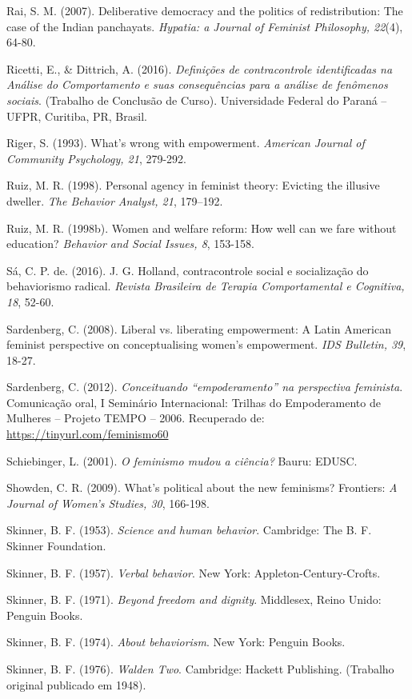 \hangindent=25pt
\noindent Rai, S. M. (2007). Deliberative democracy and the politics of redistribution: The case of the Indian panchayats. \textit{Hypatia: a Journal of Feminist Philosophy, 22}(4), 64-80.

\hangindent=25pt
\noindent Ricetti, E., \& Dittrich, A. (2016). \textit{Definições de contracontrole identificadas na Análise do Comportamento e suas consequências para a análise de fenômenos sociais}. (Trabalho de Conclusão de Curso). Universidade Federal do Paraná – UFPR, Curitiba, PR, Brasil.

\hangindent=25pt
\noindent Riger, S. (1993). What’s wrong with empowerment. \textit{American Journal of Community Psychology, 21}, 279-292.

\hangindent=25pt
\noindent Ruiz, M. R. (1998). Personal agency in feminist theory: Evicting the illusive dweller. \textit{The Behavior Analyst, 21}, 179–192.

\hangindent=25pt
\noindent Ruiz, M. R. (1998b). Women and welfare reform: How well can we fare without education? \textit{Behavior and Social Issues, 8}, 153-158.

\hangindent=25pt
\noindent Sá, C. P. de. (2016). J. G. Holland, contracontrole social e socialização do behaviorismo radical. \textit{Revista Brasileira de Terapia Comportamental e Cognitiva, 18}, 52-60.

\hangindent=25pt
\noindent Sardenberg, C. (2008). Liberal vs. liberating empowerment: A Latin American 	feminist perspective on conceptualising women's empowerment. \textit{IDS Bulletin, 39}, 18-27.

\hangindent=25pt
\noindent Sardenberg, C. (2012). \textit{Conceituando ``empoderamento'' na perspectiva feminista}. Comunicação oral, I Seminário Internacional: Trilhas do Empoderamento de Mulheres – Projeto TEMPO – 2006. Recuperado de: \url{https://tinyurl.com/feminismo60}

\hangindent=25pt
\noindent Schiebinger, L. (2001). \textit{O feminismo mudou a ciência?} Bauru: EDUSC.

\hangindent=25pt
\noindent Showden, C. R. (2009). What’s political about the new feminisms? Frontiers: \textit{A Journal of Women’s Studies, 30}, 166-198.

\hangindent=25pt
\noindent Skinner, B. F. (1953). \textit{Science and human behavior}. Cambridge: The B. F. Skinner Foundation.

\hangindent=25pt
\noindent Skinner, B. F. (1957). \textit{Verbal behavior}. New York: Appleton-Century-Crofts.

\hangindent=25pt
\noindent Skinner, B. F. (1971). \textit{Beyond freedom and dignity}. Middlesex, Reino Unido: Penguin Books. 

\hangindent=25pt
\noindent Skinner, B. F. (1974). \textit{About behaviorism}. New York: Penguin Books.

\hangindent=25pt
\noindent Skinner, B. F. (1976). \textit{Walden Two}. Cambridge: Hackett Publishing. (Trabalho original publicado em 1948).
